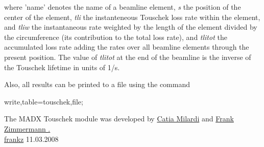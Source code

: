 {\normalsize where 'name' denotes the name of a 
 beamline element, \textit{s} the position of the center of the element,\textit{ tli} 
 the instanteneous Touschek loss rate within the element, and \textit{tliw} the 
 instantaneous rate weighted by the length of the element divided by the 
 circumference (its contribution to the total loss rate), and\textit{ tlitot }the 
 accumulated loss rate adding the rates over all beamline elements through the 
 present position. The value of \textit{tlitot} at the end of the beamline is the 
 inverse of the Touschek lifetime in units of 1/s.}

Also, all results can be printed to a file using the command 

write,table=touschek,file;

The MADX Touschek module was developed by
 \href{mailto:catia.milardi@lnf.infn.it}{Catia Milardi} and
 \href{mailto:frank.zimmermann@cern.ch}{Frank Zimmermann . }
\\\href{http://consult.cern.ch/xwho/people/62690}{frankz} 
  11.03.2008 
 

